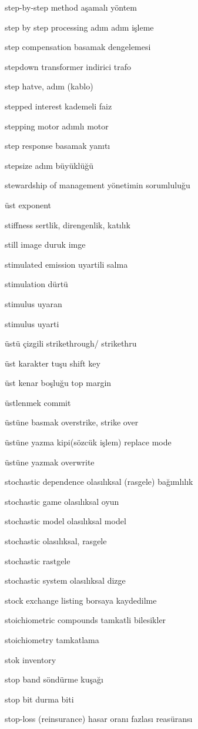 \documentclass[12pt,fleqn]{article}\usepackage{../../common}
\begin{document}
step-by-step method aşamalı yöntem

step by step processing adım adım işleme

step compensation basamak dengelemesi

stepdown transformer indirici trafo

step hatve, adım (kablo)

stepped interest kademeli faiz

stepping motor adımlı motor

step response basamak yanıtı

stepsize adım büyüklüğü

stewardship of management yönetimin sorumluluğu

üst exponent

stiffness sertlik, direngenlik, katılık

still image duruk imge

stimulated emission uyartili salma

stimulation dürtü

stimulus uyaran

stimulus uyarti

üstü çizgili strikethrough/ strikethru

üst karakter tuşu shift key

üst kenar boşluğu top margin

üstlenmek commit

üstüne basmak overstrike, strike over

üstüne yazma kipi(sözcük işlem) replace mode

üstüne yazmak overwrite

stochastic dependence olasılıksal (rasgele) bağımlılık

stochastic game olasılıksal oyun

stochastic model olasılıksal model

stochastic olasılıksal, rasgele

stochastic rastgele

stochastic system olasılıksal dizge

stock exchange listing borsaya kaydedilme

stoichiometric compounds tamkatli bilesikler

stoichiometry tamkatlama

stok inventory

stop band söndürme kuşağı

stop bit durma biti

stop-loss (reinsurance) hasar oranı fazlası reasüransı
\end{document}
